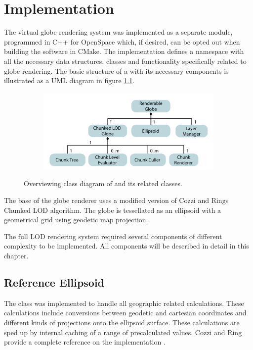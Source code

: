 \chapter{Implementation}
The virtual globe rendering system was implemented as a separate module, programmed in C++ for OpenSpace which, if desired, can be opted out when building the software in CMake. The implementation defines a namespace with all the necessary data structures, classes and functionality specifically related to globe rendering. The basic structure of a  with its necessary components is illustrated as a UML diagram in figure \ref{fig:renderableglobe}.

\begin{figure}[htbp]
    \centering
    \begin{subfigure}[bt]{0.8\textwidth}
        \includegraphics[width=\textwidth]{figures/implementation/renderable_globe.pdf}
    \end{subfigure}
    \caption{Overviewing class diagram of  and its related classes.}
    \label{fig:renderableglobe}
\end{figure}

The base of the globe renderer uses a modified version of Cozzi and Rings Chunked LOD algorithm. The globe is tessellated as an ellipsoid with a geometrical grid using geodetic map projection.

The full LOD rendering system required several components of different complexity to be implemented. All components will be described in detail in this chapter.

\section{Reference Ellipsoid}
The  class was implemented to handle all geographic related calculations.  These calculations include conversions between geodetic and cartesian coordinates and different kinds of projections onto the ellipsoid surface. These calculations are sped up by internal caching of a range of precalculated values. Cozzi and Ring provide a complete reference on the implementation \cite[p. 17]{cozzi11}.

